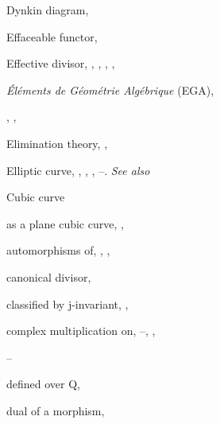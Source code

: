{{\noindent\hspace*{0.0bp}Dynkin diagram, \par
\vspace{8.55bp}
\noindent\hspace*{0.0bp}Effaceable functor, \par
\noindent\hspace*{0.0bp}Effective divisor, , , , , \par
\noindent\hspace*{0.0bp}\emph{\'El\'ements de G\'eom\'etrie Alg\'ebrique} (EGA),\par
\noindent\hspace*{15.0bp}, , \par
\noindent\hspace*{0.0bp}Elimination theory, , \par
\noindent\hspace*{0.0bp}Elliptic curve, , , , --. \emph{See also}\par
\noindent\hspace*{15.0bp}Cubic curve\par
\noindent\hspace*{7.5bp}as a plane cubic curve, , \par
\noindent\hspace*{7.5bp}automorphisms of, , , \par
\noindent\hspace*{7.5bp}canonical divisor, \par
\noindent\hspace*{7.5bp}classified by j-invariant, , \par
\noindent\hspace*{7.5bp}complex multiplication on, --, ,\par
\noindent\hspace*{15.0bp}--\par
\noindent\hspace*{7.5bp}defined over Q, \par
\noindent\hspace*{7.5bp}dual of a morphism, \par
}}
